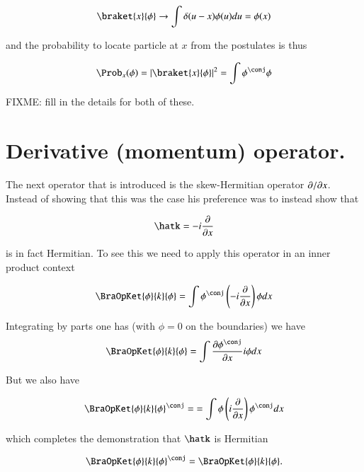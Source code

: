 \begin{align*}
\braket{x}{\phi} \rightarrow \int \delta(u-x) \phi(u) du = \phi(x)
\end{align*}

and the probability to locate particle at $x$ from the postulates is thus

\begin{align*}
\Prob_x(\phi) = \Abs{\braket{x}{\phi}}^2 = \int \phi^\conj \phi
\end{align*}

FIXME: fill in the details for both of these.

\section{Derivative (momentum) operator. }

The next operator that is introduced is the skew-Hermitian operator ${\partial {}}/{\partial {x}}$.  Instead of showing that this was the case his preference was
to instead show that 

\begin{align*}
\hatk = - i \PD{x}{}
\end{align*}

is in fact Hermitian.  To see this we need to apply this operator in an inner product context

\begin{align*}
\BraOpKet{\phi}{k}{\phi} 
&= \int \phi^\conj \left( - i \PD{x}{} \right) \phi dx \\
\end{align*}

Integrating by parts one has (with $\phi = 0$ on the boundaries) we have
\begin{align*}
\BraOpKet{\phi}{k}{\phi} 
&= \int \PD{x}{\phi^\conj} i \phi dx \\
\end{align*}

But we also have

\begin{align*}
\BraOpKet{\phi}{k}{\phi}^\conj = 
&= \int \phi\left( i \PD{x}{} \right) \phi^\conj dx \\
\end{align*}

which completes the demonstration that $\hatk$ is Hermitian

\begin{align*}
\BraOpKet{\phi}{k}{\phi}^\conj = \BraOpKet{\phi}{k}{\phi}.
\end{align*}


